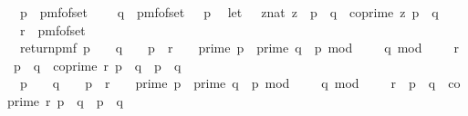 \begin{isabellebody}
\ \ p\ {\isasymleftarrow}\ pmf{\isacharunderscore}{\kern0pt}of{\isacharunderscore}{\kern0pt}set\ {\isasymK}{\isacharsemicolon}{\kern0pt}\ \isanewline
\ \ q\ {\isasymleftarrow}\ pmf{\isacharunderscore}{\kern0pt}of{\isacharunderscore}{\kern0pt}set\ {\isacharparenleft}{\kern0pt}{\isasymK}\ {\isacharminus}{\kern0pt}\ {\isacharbraceleft}{\kern0pt}p{\isacharbraceright}{\kern0pt}{\isacharparenright}{\kern0pt}{\isacharsemicolon}{\kern0pt}\isanewline
\ \ let\ {\isasymZ}\ {\isacharequal}{\kern0pt}\ {\isacharbraceleft}{\kern0pt}{\isacharparenleft}{\kern0pt}z{\isacharcolon}{\kern0pt}{\isacharcolon}{\kern0pt}nat{\isacharparenright}{\kern0pt}{\isachardot}{\kern0pt}\ z\ {\isacharless}{\kern0pt}\ p\ {\isacharasterisk}{\kern0pt}\ q\ {\isasymand}\ coprime\ z\ {\isacharparenleft}{\kern0pt}p\ {\isacharasterisk}{\kern0pt}\ q{\isacharparenright}{\kern0pt}{\isacharbraceright}{\kern0pt}{\isacharsemicolon}{\kern0pt}\isanewline
\ \ r\ {\isasymleftarrow}\ pmf{\isacharunderscore}{\kern0pt}of{\isacharunderscore}{\kern0pt}set\ {\isasymZ}{\isacharsemicolon}{\kern0pt}\isanewline
\ \ return{\isacharunderscore}{\kern0pt}pmf\ {\isacharparenleft}{\kern0pt}{\isacharparenleft}{\kern0pt}{\isacharparenleft}{\kern0pt}{\isacharparenleft}{\kern0pt}p\ {\isasymin}\ {\isasymK}\ {\isasymand}\ q\ {\isasymin}\ {\isasymK}\ {\isacharminus}{\kern0pt}\ {\isacharbraceleft}{\kern0pt}p{\isacharbraceright}{\kern0pt}\ {\isasymand}\ r\ {\isasymin}\ {\isasymZ}{\isacharparenright}{\kern0pt}\ {\isasymlongrightarrow}\ prime\ p\ {\isasymand}\ prime\ q\ {\isasymand}\ p\ mod\ {}\ {\isacharequal}{\kern0pt}\ {}\ {\isasymand}\ q\ mod\ {}\ {\isacharequal}{\kern0pt}\ {}\ {\isasymand}\ r\ {\isacharless}{\kern0pt}\ p\ {\isacharasterisk}{\kern0pt}\ q\ {\isasymand}\ coprime\ r\ {\isacharparenleft}{\kern0pt}p\ {\isacharasterisk}{\kern0pt}\ q{\isacharparenright}{\kern0pt}\ {\isasymand}\ p\ {\isasymnoteq}\ q{\isacharparenright}{\kern0pt}\isanewline
\ {\isasymand}\ {\isacharparenleft}{\kern0pt}{\isasymnot}{\isacharparenleft}{\kern0pt}p\ {\isasymin}\ {\isasymK}\ {\isasymand}\ q\ {\isasymin}\ {\isasymK}\ {\isacharminus}{\kern0pt}\ {\isacharbraceleft}{\kern0pt}p{\isacharbraceright}{\kern0pt}\ {\isasymand}\ r\ {\isasymin}\ {\isasymZ}{\isacharparenright}{\kern0pt}\ {\isasymlongrightarrow}\ prime\ p\ {\isasymand}\ prime\ q\ {\isasymand}\ p\ mod\ {}\ {\isacharequal}{\kern0pt}\ {}\ {\isasymand}\ q\ mod\ {}\ {\isacharequal}{\kern0pt}\ {}\ {\isasymand}\ r\ {\isacharless}{\kern0pt}\ p\ {\isacharasterisk}{\kern0pt}\ q\ {\isasymand}\ coprime\ r\ {\isacharparenleft}{\kern0pt}p\ {\isacharasterisk}{\kern0pt}\ q{\isacharparenright}{\kern0pt}\ {\isasymand}\ p\ {\isasymnoteq}\ q{\isacharparenright}{\kern0pt}{\isacharparenright}{\kern0pt}\isanewline

\end{isabellebody}
